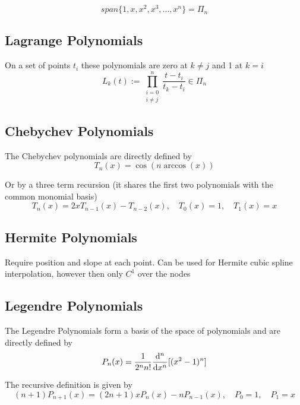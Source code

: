 \documentclass[
    a4paper,
    11pt
]{article}
\begin{document}
\begin{equation}
    span\{1, x, x^2, x^3, ..., x^n\} = \Pi_n
\end{equation}

\subsection{Lagrange Polynomials}

On a set of points $t_i$ these polynomials are zero at $k \neq j$ and 1 at $k =
i$
\begin{equation}
    L_k(t) := \prod_{\substack{i=0 \\ i\neq j}}^{n} \frac{t - t_i}{t_k - t_i}
    \in \Pi_n
\end{equation}

\subsection{Chebychev Polynomials}

The Chebychev polynomials are directly defined by
\begin{equation}
    T_n(x) = \cos(n\arccos(x))
\end{equation}

Or by a three term recursion (it shares the first two polynomials with the
common monomial basis)
\begin{equation}
    T_n(x) = 2xT_{n-1}(x) - T_{n-2}(x), \quad T_0(x) = 1, \quad T_1(x) = x
\end{equation}

\subsection{Hermite Polynomials}

Require position and slope at each point. Can be used for Hermite cubic spline
interpolation, however then only $C^1$ over the nodes

\subsection{Legendre Polynomials}

The Legendre Polynomials form a basis of the space of polynomials and are
directly defined by
\begin{equation}
    P_n(x) = \frac{1}{2^n n!} \dv[n]{}{x}[(x^2 - 1)^n]
\end{equation}

The recursive definition is given by
\begin{equation}
    (n+1)P_{n+1}(x) = (2n+1)xP_n(x) - n P_{n-1}(x), \quad P_0 = 1, \quad P_1=x
\end{equation}
\end{document}
